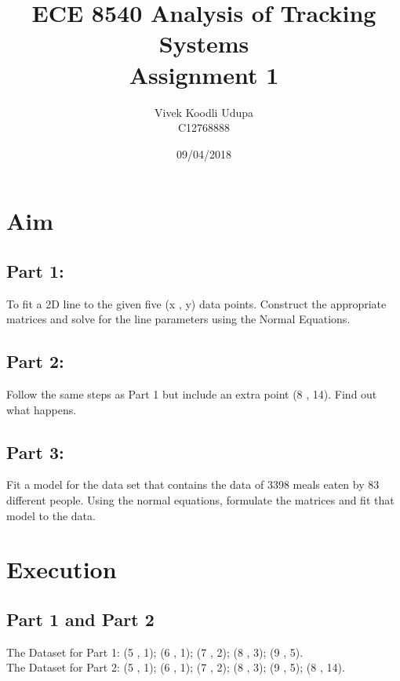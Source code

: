 \documentclass{article}
\title{ECE 8540 Analysis of Tracking Systems \\ 
	Assignment 1}
\author{Vivek Koodli Udupa \\ C12768888}
\date{09/04/2018 }
\begin{document}
\begin{titlepage}
\maketitle
{}%
\end{titlepage}

\section{Aim}
\subsection*{Part 1:} To fit a 2D line to the given five (x , y) data points. Construct the appropriate matrices and solve for the line parameters using the Normal Equations.
\subsection*{Part 2:} Follow the same steps as Part 1 but include an extra point  (8 , 14). Find out what happens.
\subsection*{Part 3:} Fit a model for the data set that contains the data of 3398 meals eaten by 83 different people. Using the normal equations, formulate the matrices and fit that model to the data. 

\section{Execution}
\subsection*{Part 1 and Part 2}
The Dataset for Part 1: (5 , 1); (6 , 1); (7 , 2); (8 , 3); (9 , 5). \\
The Dataset for Part 2: (5 , 1); (6 , 1); (7 , 2); (8 , 3); (9 , 5); (8 , 14). 
\end{document}
